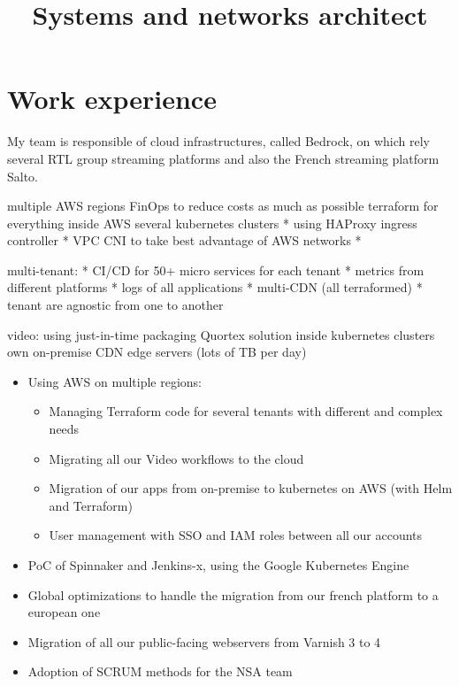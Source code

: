 \documentclass[12pt,a4paper,roman]{moderncv}          %
\title{Systems and networks architect}
\begin{document}
\makecvtitle


\section{Work experience}
{My team is responsible of cloud infrastructures, called Bedrock, on which rely several RTL group streaming platforms and also the French streaming platform Salto.


multiple AWS regions
FinOps to reduce costs as much as possible
terraform for everything inside AWS
several kubernetes clusters
* using HAProxy ingress controller
* VPC CNI to take best advantage of AWS networks
* 

multi-tenant:
* CI/CD for 50+ micro services for each tenant
* metrics from different platforms
* logs of all applications
* multi-CDN (all terraformed)
* tenant are agnostic from one to another



video:
using just-in-time packaging Quortex solution inside kubernetes clusters
own on-premise CDN edge servers (lots of TB per day)




\begin{itemize}
  \item Using AWS on multiple regions:
  \begin{itemize}
    \item Managing Terraform code for several tenants with different and complex needs
    \item Migrating all our Video workflows to the cloud 
    \item Migration of our apps from on-premise to kubernetes on AWS (with Helm and Terraform)
    \item User management with SSO and IAM roles between all our accounts
  \end{itemize}
  \item PoC of Spinnaker and Jenkins-x, using the Google Kubernetes Engine
  \item Global optimizations to handle the migration from our french platform to a european one
  \item Migration of all our public-facing webservers from Varnish 3 to 4
  \item Adoption of SCRUM methods for the NSA team
\end{itemize}}
\end{document}
